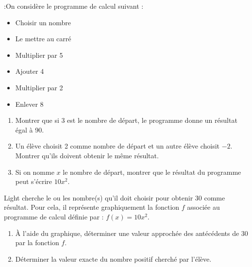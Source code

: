  :On considère le programme de calcul suivant :

\begin{minipage}{0.4\textwidth}
    \begin{itemize}
        \item Choisir un nombre
        \item Le mettre au carré
        \item Multiplier par 5
        \item Ajouter 4
        \item Multiplier par 2
        \item Enlever 8
    \end{itemize}
\end{minipage}
\hfil
\begin{minipage}{0.55\textwidth}
    \begin{enumerate}
    \item Montrer que si 3 est le nombre de départ, le programme donne un résultat égal à 90.
    \item Un élève choisit 2 comme nombre de départ et un autre élève choisit $-2$. \\
    Montrer qu'ils doivent obtenir le même résultat.
    \item Si on nomme $x$ le nombre de départ, montrer que le résultat du programme peut s'écrire $10x^2$.
    \end{enumerate}
\end{minipage}


Light cherche le ou les nombre(s) qu'il doit choisir pour obtenir 30 comme résultat. Pour cela, il représente graphiquement la fonction $f$ associée au programme de calcul définie par : $f(x)=10x^2$.

\begin{center}
        \newcommand{\xmin}{-22}
        \newcommand{\xmax}{22}
        \newcommand{\ymin}{-5}
        \newcommand{\ymax}{45}
        \newcommand{\fnct}{f}
                        
\end{center}

\begin{enumerate}[start=4]
    \item À l'aide du graphique, déterminer une valeur approchée des antécédents de 30 par la fonction $f$.

    \item Déterminer la valeur exacte du nombre positif cherché par l'élève.

\end{enumerate}
